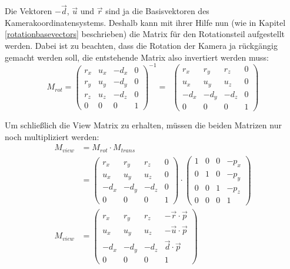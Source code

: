 Die Vektoren $-\vec d$, $\vec u$ und $\vec r$ sind ja die Basisvektoren des Kamerakoordinatensystems. Deshalb kann mit ihrer Hilfe nun (wie in Kapitel \ref{rotationbasevectors} beschrieben) die Matrix für den Rotationsteil aufgestellt werden. Dabei ist zu beachten, dass die Rotation der Kamera ja rückgängig gemacht werden soll, die entstehende Matrix also invertiert werden muss:
\begin{equation}
 M_{rot} =
 \begin{pmatrix}
  r_x & u_x & -d_x & 0 \\
  r_y & u_y & -d_y & 0 \\
  r_z & u_z & -d_z & 0 \\
  0 & 0 & 0 & 1
 \end{pmatrix}^{-1} = \enspace
 \begin{pmatrix}
   r_x &  r_y &  r_z & 0 \\
   u_x &  u_y &  u_z & 0 \\
  -d_x & -d_y & -d_z & 0 \\
   0 & 0 & 0 & 1
 \end{pmatrix}
\end{equation}

Um schließlich die View Matrix zu erhalten, müssen die beiden Matrizen nur noch multipliziert werden:
\begin{equation}
\begin{split}
 M_{view} &= M_{rot} \cdot M_{trans} \\
 &=
 \begin{pmatrix}
   r_x &  r_y &  r_z & 0 \\
   u_x &  u_y &  u_z & 0 \\
  -d_x & -d_y & -d_z & 0 \\
   0 & 0 & 0 & 1
 \end{pmatrix} \cdot 
 \begin{pmatrix}
  1 & 0 & 0 & -p_x \\
  0 & 1 & 0 & -p_y \\
  0 & 0 & 1 & -p_z \\
  0 & 0 & 0 & 1
 \end{pmatrix} \\
 M_{view} &=
 \begin{pmatrix}
   r_x &  r_y &  r_z & -\vec r \cdot \vec p \\
   u_x &  u_y &  u_z & -\vec u \cdot \vec p \\
  -d_x & -d_y & -d_z & \vec d \cdot \vec p \\
   0 & 0 & 0 & 1
 \end{pmatrix}
\end{split}
\end{equation}

